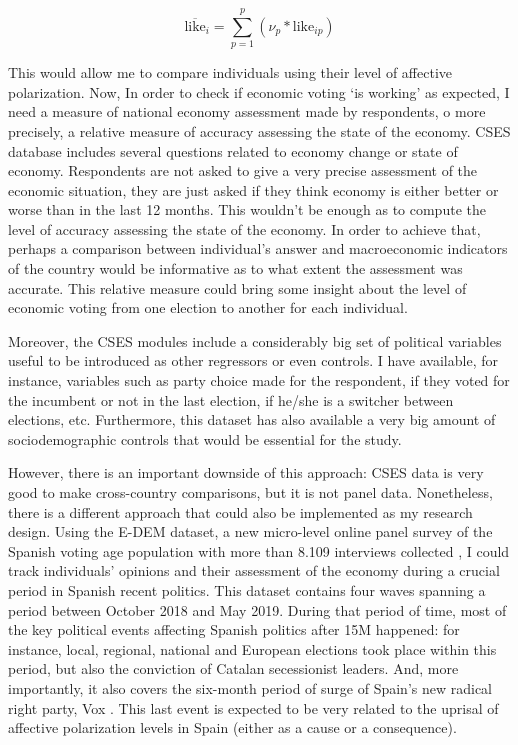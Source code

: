 \documentclass[a4paper, svgnames]{article}
\begin{document}
$$
\overline{\text{like}}_i = \sum^p_{p=1} (\nu_p * \text{like}_{ip})
$$

This would allow me to compare individuals using their level of affective polarization. Now, In order to check if economic voting `is working' as expected, I need a measure of national economy assessment made by respondents, o more precisely, a relative measure of accuracy assessing the state of the economy. CSES database includes several questions related to economy change or state of economy. Respondents are not asked to give a very precise assessment of the economic situation, they are just asked if they think economy is either better or worse than in the last 12 months. This wouldn't be enough as to compute the level of accuracy assessing the state of the economy. In order to achieve that, perhaps a comparison between individual's answer and macroeconomic indicators of the country would be informative as to what extent the assessment was accurate. This relative measure could bring some insight about the level of economic voting from one election to another for each individual.

Moreover, the CSES modules include a considerably big set of political variables useful to be introduced as other regressors or even controls. I have available, for instance, variables such as party choice made for the respondent, if they voted for the incumbent or not in the last election, if he/she is a switcher between elections, etc. Furthermore, this dataset has also available a very big amount of sociodemographic controls that would be essential for the study.

However, there is an important downside of this approach: CSES data is very good to make cross-country comparisons, but it is not panel data. Nonetheless, there is a different approach that could also be implemented as my research design. Using the E-DEM dataset, a new micro-level online panel survey of the Spanish voting age population with more than 8.109 interviews collected \citep{Torcal2020}, I could track individuals' opinions and their assessment of the economy during a crucial period in Spanish recent politics. This dataset contains four waves spanning a period between October 2018 and May 2019. During that period of time, most of the key political events affecting Spanish politics after 15M happened: for instance, local, regional, national and European elections took place within this period, but also the conviction of Catalan secessionist leaders. And, more importantly, it also covers the six-month period of surge of Spain's new radical right party, Vox \citep{Torcal2020}. This last event is expected to be very related to the uprisal of affective polarization levels in Spain (either as a cause or a consequence).
\end{document}
